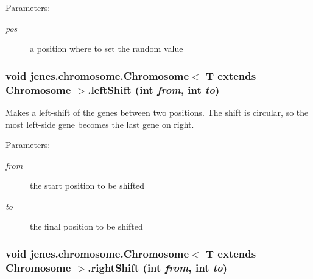 \begin{Desc}
\item[Parameters:]
\begin{description}
\item[{\em pos}]a position where to set the random value \end{description}
\end{Desc}
\hypertarget{interfacejenes_1_1chromosome_1_1_chromosome_3_01_t_01extends_01_chromosome_01_4_b04d66867a48c5ac9eafe26e0473d326}{
\subsubsection[leftShift]{\setlength{\rightskip}{0pt plus 5cm}void jenes.chromosome.Chromosome$<$ T extends Chromosome $>$.leftShift (int {\em from}, \/  int {\em to})}}
\label{interfacejenes_1_1chromosome_1_1_chromosome_3_01_t_01extends_01_chromosome_01_4_b04d66867a48c5ac9eafe26e0473d326}


Makes a left-shift of the genes between two positions. The shift is circular, so the most left-side gene becomes the last gene on right. 

\begin{Desc}
\item[Parameters:]
\begin{description}
\item[{\em from}]the start position to be shifted \item[{\em to}]the final position to be shifted \end{description}
\end{Desc}
\hypertarget{interfacejenes_1_1chromosome_1_1_chromosome_3_01_t_01extends_01_chromosome_01_4_26ee95b79d8c4012acffd9d26ab1b620}{
\subsubsection[rightShift]{\setlength{\rightskip}{0pt plus 5cm}void jenes.chromosome.Chromosome$<$ T extends Chromosome $>$.rightShift (int {\em from}, \/  int {\em to})}}
\label{interfacejenes_1_1chromosome_1_1_chromosome_3_01_t_01extends_01_chromosome_01_4_26ee95b79d8c4012acffd9d26ab1b620}


